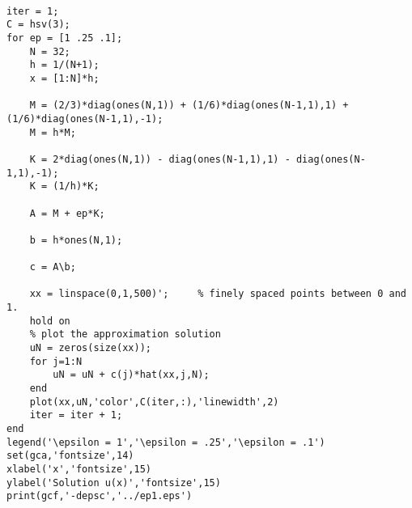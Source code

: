 {\footnotesize
\begin{verbatim}

iter = 1;
C = hsv(3);
for ep = [1 .25 .1];
    N = 32;
    h = 1/(N+1);
    x = [1:N]*h;
    
    M = (2/3)*diag(ones(N,1)) + (1/6)*diag(ones(N-1,1),1) + (1/6)*diag(ones(N-1,1),-1);
    M = h*M;
    
    K = 2*diag(ones(N,1)) - diag(ones(N-1,1),1) - diag(ones(N-1,1),-1);
    K = (1/h)*K;
    
    A = M + ep*K;
    
    b = h*ones(N,1);
    
    c = A\b;
    
    xx = linspace(0,1,500)';     % finely spaced points between 0 and 1.
    hold on
    % plot the approximation solution
    uN = zeros(size(xx));
    for j=1:N
        uN = uN + c(j)*hat(xx,j,N);
    end
    plot(xx,uN,'color',C(iter,:),'linewidth',2)
    iter = iter + 1;
end
legend('\epsilon = 1','\epsilon = .25','\epsilon = .1')
set(gca,'fontsize',14)
xlabel('x','fontsize',15)
ylabel('Solution u(x)','fontsize',15)
print(gcf,'-depsc','../ep1.eps')
\end{verbatim}
}
